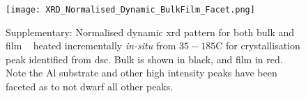 \documentclass[draft,a4paper,12pt,oneside]{article}%
\begin{document}
\begin{figure}[b]
	\centering
	\texttt{[image: XRD\_Normalised\_Dynamic\_BulkFilm\_Facet.png]}
	\caption{Supplementary: Normalised dynamic \acrshort{xrd} pattern for both bulk and film \MgZnCa~ heated incrementally \textit{in-situ} from $35-185$\degree C for crystallisation peak identified from \acrshort{dsc}. Bulk is shown in black, and film in red. Note the Al substrate and other high intensity peaks have been faceted as to not dwarf all other peaks.}
	\label{fig:XRD_Dynamic_BulkandFilm}
\end{figure}
\end{document}
